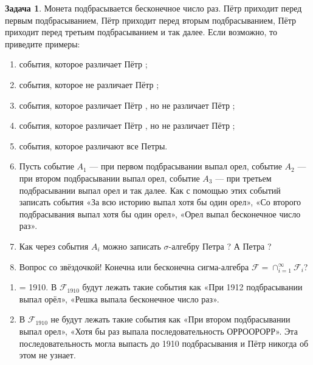 \documentclass[pdftex, 12pt, a4paper]{article}
\def\F{\ensuremath{\mathcal{F}}} %
\def \sg{\sigma}
\theoremstyle{definition} %
\newtheorem{problem}{Задача}
\numberwithin{problem}{section}
\numberwithin{blits}{section}
\newcommand{\RNumb}[1]{\uppercase\expandafter{\romannumeral #1\relax}}
\begin{document}
\begin{problem}
Монета подбрасывается бесконечное число раз. Пётр \RNumb{1} приходит перед первым подбрасыванием, Пётр \RNumb{2} приходит перед вторым подбрасыванием, Пётр \RNumb{3} приходит перед третьим подбрасыванием и так далее. Если возможно, то приведите примеры:

\begin{enumerate}
\item события, которое различает Пётр \RNumb{1910};

\item события, которое не различает Пётр \RNumb{1910};

\item события, которое различает Пётр \RNumb{5}, но не различает Пётр \RNumb{10};

\item события, которое различает Пётр \RNumb{10}, но не различает Пётр \RNumb{5};

\item события, которое различают все Петры.

\item Пусть событие $A_1$ --- при первом подбрасывании выпал орел, событие $A_2$ --- при втором подбрасывании выпал орел, событие $A_3$ --- при третьем подбрасывании выпал орел и так далее. Как с помощью этих событий записать события «За всю историю выпал хотя бы один орел», «Со второго подбрасывания выпал хотя бы один орел», «Орел выпал бесконечное число раз».

\item Как через события $A_i$ можно записать $\sg$-алгебру Петра \RNumb{1}? А Петра \RNumb{6}?

\item Вопрос со звёздочкой! Конечна или бесконечна сигма-алгебра $\F = \cap_{i=1}^{\infty} \F_i$?

\end{enumerate}
\begin{sol}
\begin{enumerate}
\item \RNumb{1910} = 1910. В $\F_{1910}$ будут лежать такие события как «При 1912 подбрасывании выпал орёл», «Решка выпала бесконечное число раз». 

\item В $\F_{1910}$ не будут лежать такие события как «При втором подбрасывании выпал орел», «Хотя бы раз выпала последовательность ОРРООРОРР». Эта последовательность могла выпасть до 1910 подбрасывания и Пётр \RNumb{1910} никогда об этом не узнает.


\end{enumerate}
\end{sol}
\end{problem}
\end{document}
